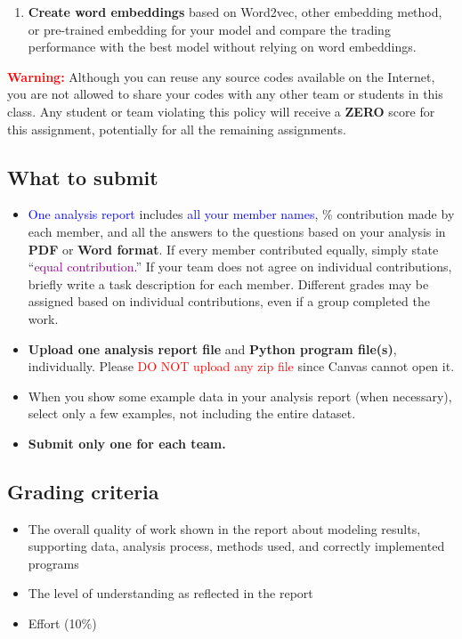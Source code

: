 \documentclass[twocolumn,12pt]{article}
\begin{document}
\begin{multicols}{2}
\begin{flushleft}
\begin{enumerate}
	\item \textbf{Create word embeddings} based on Word2vec, other embedding method, or pre-trained embedding for your model and compare the trading performance with the best model without relying on word embeddings.
\end{enumerate}

\textcolor{red}{\textbf{Warning:}} Although you can reuse any source codes available on the Internet, you are not allowed to share your codes with any other team or students in this class. Any student or team violating this policy will receive a \textbf{ZERO} score for this assignment, potentially for all the remaining assignments.

\subsection*{What to submit}
\begin{itemize}
	\item \textcolor{blue}{One analysis report} includes \textcolor{blue}{all your member names}, \% contribution made by each member, and all the answers to the questions based on your analysis in \textbf{PDF} or \textbf{Word format}. If every member contributed equally, simply state \enquote{\textcolor{purple}{equal contribution}.} If your team does not agree on individual contributions, briefly write a task description for each member. Different grades may be assigned based on individual contributions, even if a group completed the work.
	\item \textbf{Upload one analysis report file} and \textbf{Python program file(s)}, individually. Please \textcolor{red}{DO NOT upload any zip file} since Canvas cannot open it.
	\item When you show some example data in your analysis report (when necessary), select only a few examples, not including the entire dataset.
	\item \textbf{Submit only one for each team.}
\end{itemize}

\subsection*{Grading criteria}
\begin{itemize}
	\item The overall quality of work shown in the report about modeling results, supporting data, analysis process, methods used, and correctly implemented programs
	\item The level of understanding as reflected in the report
	\item Effort (10\%)
\end{itemize}
\fi


\end{flushleft}
\end{multicols}
\end{document}
